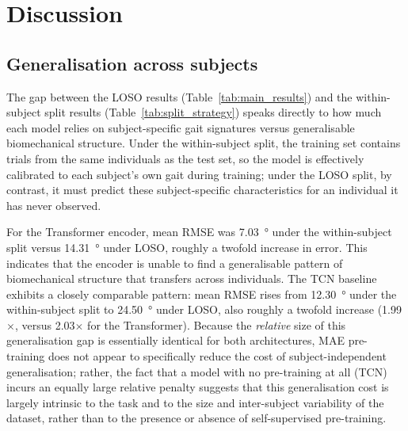 
\section{Discussion}\label{sec:Discussion}


\subsection{Generalisation across subjects}\label{sec:disc-generalisation}

The gap between the LOSO results (Table~\ref{tab:main_results}) and the
within-subject split results (Table~\ref{tab:split_strategy}) speaks directly to
how much each model relies on subject-specific gait signatures versus
generalisable biomechanical structure. Under the within-subject split, the
training set contains trials from the same individuals as the test set, so the
model is effectively calibrated to each subject's own gait during training;
under the LOSO split, by contrast, it must predict these subject-specific
characteristics for an individual it has never observed.

For the Transformer encoder, mean RMSE was \SI{7.03}{\degree} under the
within-subject split versus \SI{14.31}{\degree} under LOSO, roughly a twofold
increase in error. This indicates that the encoder is unable to find a
generalisable pattern of biomechanical structure that transfers across
individuals. The TCN baseline exhibits a closely comparable pattern: mean RMSE
rises from \SI{12.30}{\degree} under the within-subject split to
\SI{24.50}{\degree} under LOSO, also roughly a twofold increase
(\num{1.99}$\times$, versus \num{2.03}$\times$ for the Transformer). Because
the \emph{relative} size of this generalisation gap is essentially identical
for both architectures, MAE pre-training does not appear to specifically
reduce the cost of subject-independent generalisation; rather, the fact that a
model with no pre-training at all (TCN) incurs an equally large relative
penalty suggests that this generalisation cost is largely intrinsic to the
task and to the size and inter-subject variability of the dataset, rather
than to the presence or absence of self-supervised pre-training.

